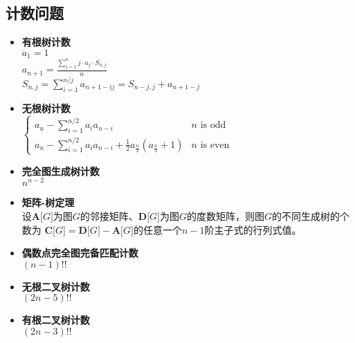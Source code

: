 	\subsection*{计数问题}
		\begin{itemize}
			\item \textbf{有根树计数}
			\\$ a_1 = 1 $
			\\$ a_{n + 1} = \frac{\sum\limits_{j = 1}^{n} j \cdot a_j \cdot S_{n, j}}{n} $
			\\$ S_{n, j} = \sum\limits_{i = 1}^{n / j} a_{n + 1 - ij} = S_{n - j, j} + a_{n + 1 - j} $
			\item \textbf{无根树计数}
			\\$ \begin{cases}
				a_n - \sum\limits_{i = 1}^{n / 2} a_i a_{n - i} & n \text{ is odd}\\
				a_n - \sum\limits_{i = 1}^{n / 2} a_i a_{n - i} + \frac{1}{2} a_{\frac{n}{2}} (a_{\frac{n}{2}} + 1) & n \text{ is even}
			\end{cases} $
			\item \textbf{完全图生成树计数}
			\\$ n^{n - 2} $
			\item \textbf{矩阵-树定理}
			\\设$ \mathbf{A}\lbrack G \rbrack $为图$ G $的邻接矩阵、$ \mathbf{D}\lbrack G \rbrack $为图$ G $的度数矩阵，则图$ G $的不同生成树的个数为 $ \mathbf{C}\lbrack G \rbrack = \mathbf{D}\lbrack G \rbrack - \mathbf{A}\lbrack G \rbrack $的任意一个$ n - 1 $阶主子式的行列式值。
			\item \textbf{偶数点完全图完备匹配计数}
			\\$ (n - 1)!! $
			\item \textbf{无根二叉树计数}
			\\$ (2n - 5)!! $
			\item \textbf{有根二叉树计数}
			\\$ (2n - 3)!! $
		\end{itemize}
